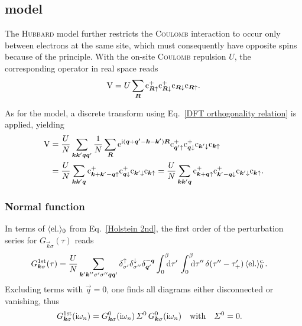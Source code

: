\subsection{ model}

The \textsc{Hubbard} model further restricts the \textsc{Coulomb} interaction to
occur only between electrons at the same site, which must consequently have
opposite spins because of the  principle. With the on-site
\textsc{Coulomb} repulsion $U$, the corresponding operator in real space reads
%
\begin{equation*}
    \mathrm V = U \sum_{\boldsymbol R}
    \mathrm c_{\boldsymbol R \uparrow}^+
    \mathrm c_{\boldsymbol R \downarrow}^+
    \mathrm c_{\boldsymbol R \downarrow}
    \mathrm c_{\boldsymbol R \uparrow}.
\end{equation*}

As for the  model, a discrete  transform using
Eq.~\ref{DFT orthogonality relation} is applied, yielding
%
\begin{align*}
    \mathrm V &=
    \frac U N \sum_{\boldsymbol k \boldsymbol k' \boldsymbol q \boldsymbol q'}
    \frac 1 N \sum_{\boldsymbol R}
    \mathrm e^{\mathrm i (\boldsymbol q + \boldsymbol{q'} - \boldsymbol k - \boldsymbol{k'}) \boldsymbol R}
    \mathrm c_{\boldsymbol q' \uparrow}^+
    \mathrm c_{\boldsymbol q \downarrow}^+
    \mathrm c_{\boldsymbol k' \downarrow}
    \mathrm c_{\boldsymbol k \uparrow}
    \\
    &= \frac U N \sum_{\boldsymbol k \boldsymbol k' \boldsymbol q}
    \mathrm c_{\boldsymbol k + \boldsymbol k' - \boldsymbol q \uparrow}^+
    \mathrm c_{\boldsymbol q \downarrow}^+
    \mathrm c_{\boldsymbol k' \downarrow}
    \mathrm c_{\boldsymbol k \uparrow}
    = \frac U N \sum_{\boldsymbol k \boldsymbol k' \boldsymbol q}
    \mathrm c_{\boldsymbol k + \boldsymbol q \uparrow}^+
    \mathrm c_{\boldsymbol k' - \boldsymbol q \downarrow}^+
    \mathrm c_{\boldsymbol k' \downarrow} \mathrm c_{\boldsymbol k \uparrow}.
\end{align*}

\subsubsection{Normal  function}

In terms of $\langle\text{el.}\rangle_0$ from Eq.~\ref{Holstein 2nd}, the first order of
the perturbation series for $G_{\vec k \sigma}(\tau)$ reads
%
\begin{align*}
    G \super{1st}_{\vec k \sigma}(\tau) &=
    \frac U N \sum_{\vec k' \vec k'' \sigma' \sigma'' \vec q \vec q'}
    \delta_{\sigma'}^\up \delta_{\sigma''}^\down \delta_{\vec q'}^{-\vec q}
    \int \from 0 \till \beta \D \tau' \,
    \int \from 0 \till \beta \D \tau'' \,
    \delta(\tau'' - \tau'_+) \,
    \av{\text{el.}}_0 \super{c.}.
\end{align*}
%
Excluding terms with $\vec q = 0$, one finds all diagrams either disconnected or
vanishing, thus
%
\begin{align*}
    G \sp{\text{1st}}_{\boldsymbol k \sigma}(\mathrm i \omega_n)
    &= G^0_{\boldsymbol k \sigma}(\mathrm i \omega_n) \,
    \varSigma^0 \,
    G^0_{\boldsymbol k \sigma}(\mathrm i \omega_n)
    \quad \text{with} \quad
    \varSigma^0 = 0.
\end{align*}

